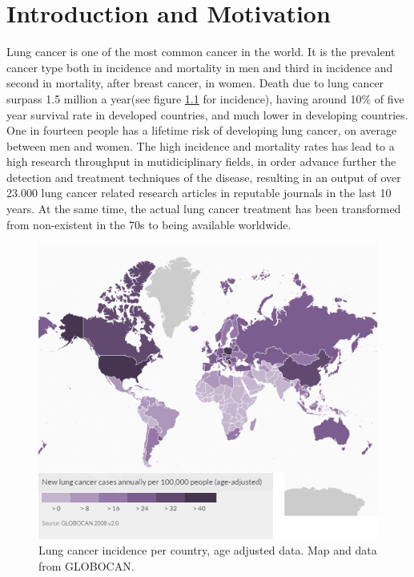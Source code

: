 \chapter{Introduction and Motivation}\label{ch:intro}


Lung cancer is one of the most common cancer in the world. It is the prevalent cancer type both in incidence and mortality in men and third in incidence and second in mortality, after breast cancer, in women\cite{WCR2014}. Death due to lung cancer surpass 1.5 million a year(see figure \ref{fig:world} for incidence), having around 10\% of five year survival rate in developed countries, and much lower in developing countries\cite{CRUK2014}. One in fourteen people has a lifetime risk of developing lung cancer\cite{Harrisons2012}, on average between men and women. The high incidence and mortality rates has lead to a high research throughput in mutidiciplinary fields, in order advance further the detection and treatment techniques of the disease, resulting in an output of over 23.000 lung cancer related research articles in reputable journals in the last 10 years\cite{Nature2015}. At the same time, the  actual lung cancer treatment has been transformed from non-existent in the 70s to being available worldwide\cite{Comis2003}.


\begin{figure}[ht]
\begin{center}
\includegraphics[width=0.65\columnwidth]{StateOfArt/worldmap.png}
\caption[Lung cancer incidence in the world]{Lung cancer incidence per country, age adjusted data. Map and data from {GLOBOCAN}\cite{GLOBOCAN2010}.}
\label{fig:world}
\end{center}
\end{figure}

